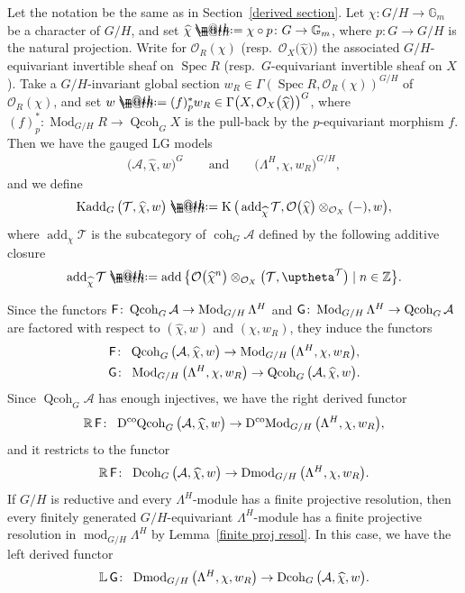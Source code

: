 \documentclass[10pt,a4paper]{amsart}
\makeatletter
\newcommand*{\defeq}{\mathrel{\rlap{%
 \raisebox{0.3ex}{$\m@th\cdot$}}%
 \raisebox{-0.3ex}{$\m@th\cdot$}}%
 =}
\numberwithin{equation}{section}
\newcommand{\Kadd}{\operatorname{Kadd}}
\newcommand{\Dmod}{\operatorname{Dmod}}
\newcommand{\DcoMod}{\operatorname{D^{co}\hspace{-0.1mm}Mod}}
\newcommand{\Dcoh}{\operatorname{Dcoh}}
\newcommand{\DcoQcoh}{\operatorname{D^{co}\hspace{-0.1mm}Qcoh}}
\newcommand{\Spec}{\operatorname{Spec}}
\newcommand{\coh}{\operatorname{coh}}
\newcommand{\Qcoh}{\operatorname{Qcoh}}
\newcommand{\Mod}{\operatorname{Mod}}
\newcommand{\fmod}{\operatorname{mod}}
\newcommand{\add}{\operatorname{add}}
\newcommand{\K}{\operatorname{K}}
\newcommand{\cA}{\mathcal{A}}
\newcommand{\cO}{\mathcal{O}}
\newcommand{\cT}{\mathcal{T}}
\newcommand{\bG}{\mathbb{G}}
\newcommand{\bL}{\mathbb{L}}
\newcommand{\bR}{\mathbb{R}}
\newcommand{\bZ}{\mathbb{Z}}
\newcommand{\F}{\operatorname{\sf{F}}}
\newcommand{\G}{\operatorname{\sf{G}}}
\makeatother
\begin{document}
Let the notation be the same as in Section~\ref{derived section}.
Let $\chi\colon G/H\to \bG_m$ be a character of $G/H$, and set $\widehat{\chi}\defeq\chi\circ p\colon G\to \bG_m$, where $p\colon G\to G/H$ is the natural projection. Write for $\cO_R(\chi)$ (resp.\ $\cO_X\big(\widehat{\chi}\big)$) the associated $G/H$-equivariant invertible sheaf on $\Spec R$ (resp.\ $G$-equivariant invertible sheaf on $X$). Take a $G/H$-invariant global section $w_R\in \Gamma(\Spec R,\cO_R(\chi))^{G/H}$ of~$\cO_R(\chi)$, and set $w\defeq (f)^*_{p}w_R\in \Gamma\big(X,\cO_X\big(\widehat{\chi}\big)\big)^G$, where $(f)^*_{p}\colon \Mod_{G/H}R\to \Qcoh_GX$ is the pull-back by the $p$-equivariant morphism $f$.
Then we have the gauged LG models
\begin{gather*}
\big(\cA,\widehat{\chi},w\big)^G \qquad \text{and}\qquad \big(\Lambda^H,\chi,w_R\big)^{G/H},
\end{gather*}
and we define
\begin{gather*}
\Kadd_G\big(\cT,\widehat{\chi},w\big)\defeq \K\big(\add_{\widehat{\chi}}\cT,\cO\big(\widehat{\chi}\big)\otimes_{\cO_X}(-),w\big),
\end{gather*}
where $\add_{\widehat{\chi}}\cT$ is the subcategory of $\coh_G\cA$ defined by the following additive closure
\begin{gather*}
\add_{\widehat{\chi}}\cT\defeq\add\big\{\cO\big(\widehat{\chi}^n\big)\otimes_{\cO_X} \big(\cT,\uptheta^{\cT}\big)\mid n\in \bZ \big\}.
\end{gather*}


Since the functors $\F\colon \Qcoh_{G}\cA\to \Mod_{G/H}\Lambda^H$ and $\G\colon \Mod_{G/H}\Lambda^H\to \Qcoh_{G}\cA$ are factored with respect to $(\widehat{\chi},w)$ and $(\chi,w_R)$, they induce the functors
\begin{gather*}
\F\colon\ \Qcoh_G\big(\cA,\widehat{\chi},w\big)\to\Mod_{G/H}\big(\Lambda^H,\chi,w_R\big),
\\
\G\colon\ \Mod_{G/H}\big(\Lambda^H,\chi,w_R\big)\to \Qcoh_G\big(\cA,\widehat{\chi},w\big).
\end{gather*}
Since $\Qcoh_G\cA$ has enough injectives, we have the right derived functor
\begin{gather*}
\bR\F\colon\ \DcoQcoh_G\big(\cA,\widehat{\chi},w\big)\to\DcoMod_{G/H}\big(\Lambda^H,\chi,w_R\big),
\end{gather*}
and it restricts to the functor
\begin{gather*}
\bR\F\colon\ \Dcoh_G\big(\cA,\widehat{\chi},w\big)\to\Dmod_{G/H}\big(\Lambda^H,\chi,w_R\big).
\end{gather*}
If $G/H$ is reductive and every $\Lambda^H$-module has a finite projective resolution, then every finitely generated $G/H$-equivariant $\Lambda^H$-module has a finite projective resolution in $\fmod_{G/H}\Lambda^H$ by Lemma~\ref{finite proj resol}. In this case, we have the left derived functor
\begin{gather*}
\bL\G\colon\ \Dmod_{G/H}\big(\Lambda^H,\chi,w_R\big)\to \Dcoh_{G}\big(\cA,\widehat{\chi},w\big).
\end{gather*}
\end{document}
